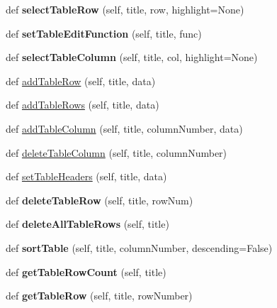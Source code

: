 \begin{DoxyCompactItemize}
def {\bfseries select\+Table\+Row} (self, title, row, highlight=None)
\item 
\mbox{\label{classappjar_1_1gui_a5236549bdb0ee196c34178b9f4bb8ae6}} 
def {\bfseries set\+Table\+Edit\+Function} (self, title, func)
\item 
\mbox{\label{classappjar_1_1gui_ad976b3d748a001fd4a37d5be69ed4fd2}} 
def {\bfseries select\+Table\+Column} (self, title, col, highlight=None)
\item 
def \hyperlink{classappjar_1_1gui_a73cc15fc34a5262a2236aba1b65e7d4c}{add\+Table\+Row} (self, title, data)
\item 
def \hyperlink{classappjar_1_1gui_ad21de28837a221a0cf6667f4d5d6361f}{add\+Table\+Rows} (self, title, data)
\item 
def \hyperlink{classappjar_1_1gui_a353ba921573317a1049091a364e4a345}{add\+Table\+Column} (self, title, column\+Number, data)
\item 
def \hyperlink{classappjar_1_1gui_abd57b7566a5ba0cb985a990f04798fa9}{delete\+Table\+Column} (self, title, column\+Number)
\item 
def \hyperlink{classappjar_1_1gui_a73e66e28db57583672fb509b3bb5324b}{set\+Table\+Headers} (self, title, data)
\item 
\mbox{\label{classappjar_1_1gui_a36d4b98e292819971a6d0c7eb9ea052d}} 
def {\bfseries delete\+Table\+Row} (self, title, row\+Num)
\item 
\mbox{\label{classappjar_1_1gui_a08e2cba5d83f9ca696639d46de04c7a8}} 
def {\bfseries delete\+All\+Table\+Rows} (self, title)
\item 
\mbox{\label{classappjar_1_1gui_a6aa76caeddd876e7292ff2d5cb09a919}} 
def {\bfseries sort\+Table} (self, title, column\+Number, descending=False)
\item 
\mbox{\label{classappjar_1_1gui_a0391c16c80e8954c38275ac3dc023fcd}} 
def {\bfseries get\+Table\+Row\+Count} (self, title)
\item 
\mbox{\label{classappjar_1_1gui_a60fe41bcaeecea2086bca2e03bfd2200}} 
def {\bfseries get\+Table\+Row} (self, title, row\+Number)
\item 

\end{DoxyCompactItemize}
